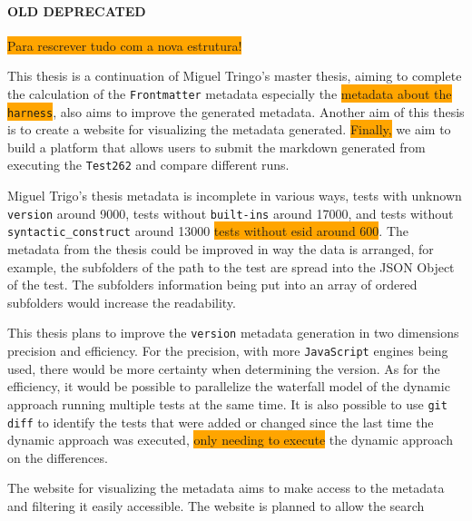 \paragraph{OLD DEPRECATED} \colorbox{orange}{Para rescrever tudo com a nova estrutura!}


This thesis is a continuation of Miguel Tringo's master thesis, aiming to complete the calculation of the \texttt{Frontmatter} metadata especially the \colorbox{orange}{metadata about the \texttt{harness}}, also aims to improve the generated metadata. Another aim of this thesis is to create a website for visualizing the metadata generated. \colorbox{orange}{Finally,} we aim to build a platform that allows users to submit the markdown generated from executing the \texttt{Test262} and compare different runs.



Miguel Trigo's thesis metadata is incomplete in various ways, tests with unknown \texttt{version} around 9000, tests without \texttt{built-ins} around 17000, and tests without \texttt{syntactic\_construct} around 13000 \colorbox{orange}{tests without esid around 600}.
%
The metadata from the thesis could be improved in way the data is arranged, for example, the subfolders of the path to the test are spread into the JSON Object of the test. The subfolders information being put into an array of ordered subfolders would increase the readability.



This thesis plans to improve the \texttt{version} metadata generation in two dimensions precision and efficiency.
For the precision, with more \texttt{JavaScript} engines being used, there would be more certainty when determining the version.
As for the efficiency, it would be possible to parallelize the waterfall model of the dynamic approach running multiple tests at the same time. It is also possible to use \texttt{git diff} to identify the tests that were added or changed since the last time the dynamic approach was executed, \colorbox{orange}{ only needing to execute} the dynamic approach on the differences.



The website for visualizing the metadata aims to make access to the metadata and filtering it easily accessible. The website is planned to allow the search 